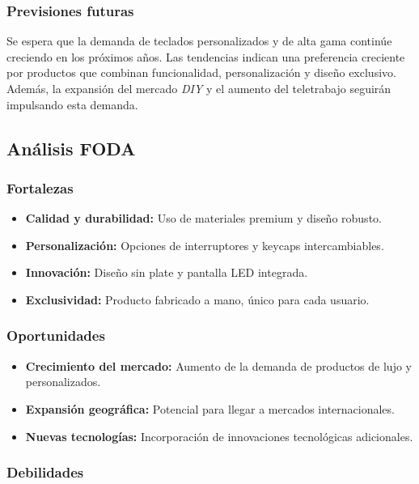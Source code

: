 \subsubsection{Previsiones futuras}

Se espera que la demanda de teclados personalizados y de alta gama continúe creciendo en los próximos años. Las tendencias indican una preferencia creciente por productos que combinan funcionalidad, personalización y diseño exclusivo. Además, la expansión del mercado \textit{DIY} y el aumento del teletrabajo seguirán impulsando esta demanda.

\subsection{Análisis FODA}

\subsubsection{Fortalezas}

\begin{itemize}
    \item \textbf{Calidad y durabilidad:} Uso de materiales premium y diseño robusto.
    \item \textbf{Personalización:} Opciones de interruptores y keycaps intercambiables.
    \item \textbf{Innovación:} Diseño sin plate y pantalla LED integrada.
    \item \textbf{Exclusividad:} Producto fabricado a mano, único para cada usuario.
\end{itemize}

\subsubsection{Oportunidades}

\begin{itemize}
    \item \textbf{Crecimiento del mercado:} Aumento de la demanda de productos de lujo y personalizados.
    \item \textbf{Expansión geográfica:} Potencial para llegar a mercados internacionales.
    \item \textbf{Nuevas tecnologías:} Incorporación de innovaciones tecnológicas adicionales.
\end{itemize}

\subsubsection{Debilidades}

